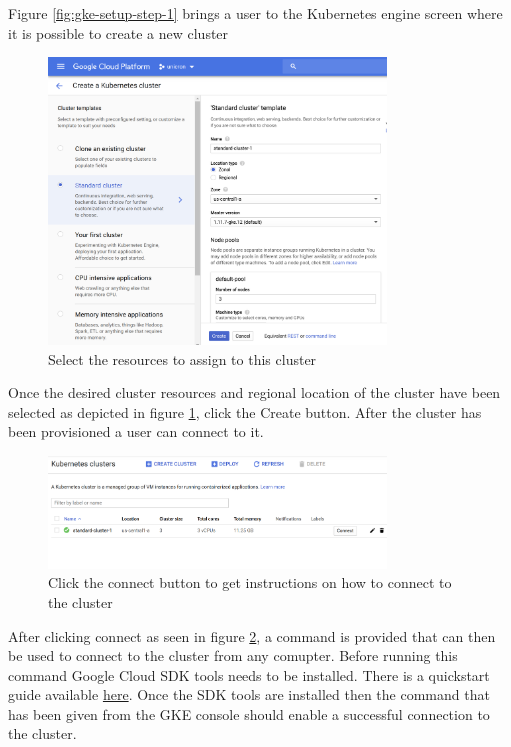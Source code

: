 \FloatBarrier

Figure \ref{fig:gke-setup-step-1} brings a user to the Kubernetes engine screen where it is possible to create a new cluster

\begin{figure}[!h]
  \centering
    \includegraphics[width=0.8\textwidth]{figures/gke-setup-2.png}
    \caption{Select the resources to assign to this cluster}
    \label{fig:gke-setup-step-2}
\end{figure}

\FloatBarrier

Once the desired cluster resources and regional location of the cluster have been selected as depicted in figure \ref{fig:gke-setup-step-2}, click the Create button. After the cluster has been provisioned a user can connect to it. 

\begin{figure}[!h]
  \centering
    \includegraphics[width=0.8\textwidth]{figures/gke-setup-3.png}
    \caption{Click the connect button to get instructions on how to connect to the cluster}
    \label{fig:gke-setup-step-3}
\end{figure}

\FloatBarrier

After clicking connect as seen in figure \ref{fig:gke-setup-step-3}, a command is provided that can then be used to connect to the cluster from any comupter. Before running this command Google Cloud SDK tools needs to be installed. There is a quickstart guide available
\href{https://cloud.google.com/sdk/docs/quickstart-linux}{here}. Once the SDK tools are installed then the command that has been given from the GKE console should enable a successful connection to the cluster.

